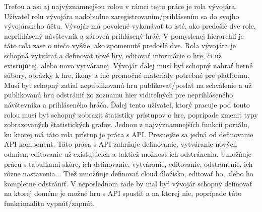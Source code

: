 Treťou a asi aj najvýznamnejšou rolou v rámci tejto práce je rola vývojára. Užívateľ rolu vývojára nadobudne zaregistrovaním/prihlásením sa do svojho vývojárskeho účtu. Vývojár má povolené vykonávať to isté, ako predošlé dve role, neprihlásený návštevník a zároveň prihlásený hráč. V pomyslenej hierarchií je táto rola zase o niečo vyššie, ako spomenuté predošlé dve. Rola vývojára je schopná vytvárať a definovať nové hry, editovať informácie o hre, či už existujúcej, alebo novo vytváranej. Vývojár ďalej musí byť schopný nahrať herné súbory, obrázky k hre, ikony a iné promočné materiály potrebné pre platformu. Musí byť schopný zatiaľ nepublikovanú hru publikovať/poslať na schválenie a už publikovanú hru odstrániť zo zoznamu hier viditeľných pre neprihláseného návštevníka a prihláseného hráča. Ďalej tento užívateľ, ktorý pracuje pod touto rolou musí byť schopný zobraziť štatistiky prístupov o hre, poprípade zmeniť typy zobrazovaných štatistických grafov. Jednou z najvýznamnejších funkcií portálu, ku ktorej má táto rola prístup je práca s API. Presnejšie sa jedná od definovanie API komponent. Táto práca s API zahrňuje definovanie, vytváranie nových odmien, editovanie už existujúcich a taktiež možnosť ich odstránenia. Umožňuje prácu s tabuľkami skóre, ich definovanie, vytváranie, editovanie, odstránenie, ich rôzne nastavenia... Tiež umožňuje definovať cloud úložisko, editovať ho, alebo ho kompletne odstrániť. V neposlednom rade by mal byť vývojár schopný definovať na ktorej doméne je možné hru s API spustiť a na ktorej nie, poprípade túto funkcionalitu vypnúť/zapnúť. 
